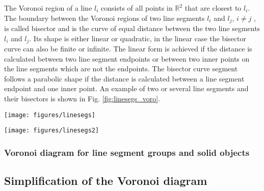 The Voronoi region of a line $l_i$ consists of all points in $\mathbb{R}^2$ that are closest to $l_i$. 
The boundary between the Voronoi regions of two line segments $l_i$ and $l_j$, $i \neq j$ , 
is called bisector and is the curve of equal distance between the two line segments $l_i$ and $l_j$.
Its shape is either linear or quadratic, in the linear case the bisector curve can also be finite or infinite.
The linear form is achieved if the distance is calculated between two line segment endpoints or between two inner 
points on the line segments which are not the endpoints.
The bisector curve segment follows a parabolic shape if the distance is calculated between a line segment endpoint
and one inner point.
An example of two or several line segments and their bisectors is shown in Fig. \ref{fig:linesegs_voro}.

\label{sec:voronoi}
\begin{figure*}
	\begin{minipage}{1 \textwidth}
		\begin{center}
			\texttt{[image: figures/linesegs]}
		\end{center}
	\end{minipage}
	\vspace{1cm}
	\begin{minipage}{1 \textwidth}
		\begin{center}
			\texttt{[image: figures/linesegs2]}
		\end{center}
	\end{minipage}
	\caption{Top panel: Voronoi regions for two line segments, $l_1$ and $l_2$.
	Bottom panel: Voronoi regions for five line segments, $l_1,\, l_2,\, ...,\, l_5$.
	The line segments and their endpoints are marked in blue. The small red points represent the Voronoi vertices.
	The black lines are the bisectors of the Voronoi regions, where the solid lines delimit finite and the dashed lines
	infinite regions. Helper lines are marked in red.
	\label{fig:linesegs_voro}}
\end{figure*}


\subsubsection*{Voronoi diagram for line segment groups and solid objects}



\subsection{Simplification of the Voronoi diagram}


